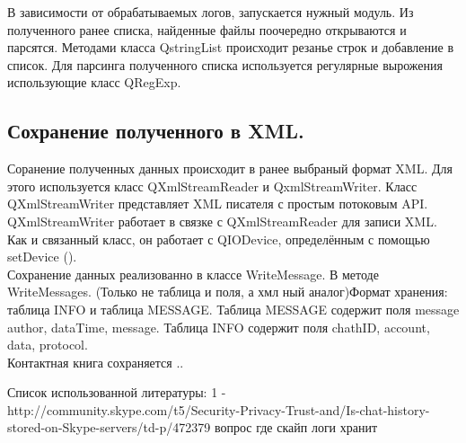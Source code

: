 В зависимости от обрабатываемых логов, запускается нужный модуль. Из полученного ранее списка, найденные файлы поочередно открываются и парсятся. Методами класса QstringList происходит резанье строк и добавление в список. Для парсинга полученного списка используется регулярные вырожения использующие класс QRegExp. 

\subsection{Сохранение полученного в XML.}

Соранение полученных данных происходит в ранее выбраный формат XML. Для этого используется класс QXmlStreamReader и QxmlStreamWriter.
Класс QXmlStreamWriter представляет XML писателя с простым потоковым API.\\

QXmlStreamWriter работает в связке с QXmlStreamReader для записи XML. Как и связанный класс, он работает с QIODevice, определённым с помощью setDevice ().\\

Сохранение данных реализованно в классе WriteMessage. В методе WriteMessages. (Только не таблица и поля, а хмл ный аналог)Формат хранения: таблица INFO и таблица MESSAGE. Таблица MESSAGE содержит поля message author, dataTime, message.	Таблица INFO содержит поля chathID, account, data, protocol.\\

Контактная книга сохраняется ..

Список использованной литературы:
1 -  http://community.skype.com/t5/Security-Privacy-Trust-and/Is-chat-history-stored-on-Skype-servers/td-p/472379 вопрос где скайп логи хранит

